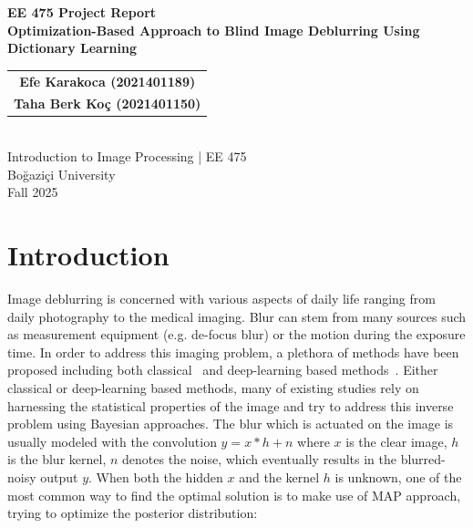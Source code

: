 \documentclass{article}
\theoremstyle{definition}
\begin{document}
\begin{titlepage}
    \centering

    {\Huge \textbf{EE 475 Project Report}}\\[3.5cm] %


{\Huge \textbf {Optimization-Based Approach to Blind Image Deblurring Using Dictionary Learning}}\\[3.5cm] %

    \begin{tabular}{c}
        \Large \textbf{Efe Karakoca (2021401189)} \\[0.5cm] %
        \Large \textbf{Taha Berk Koç (2021401150)} \\
    \end{tabular}\\[3 cm]

    {\large Introduction to Image Processing | EE 475}\\[0.5cm]

    {\large Boğaziçi University}\\[1cm]

    {\large Fall 2025}

    \vfill

    \begingroup
    \renewcommand\thefootnote{\roman{footnote}}
    \endgroup

\end{titlepage}


\section{Introduction}



Image deblurring is concerned with various aspects of daily life ranging from daily photography to the medical imaging. Blur can stem from many sources such as measurement equipment (e.g. de-focus blur) or the motion during the exposure time. In order to address this imaging problem, a plethora of methods have been proposed including both classical~\cite{ClassicBlur} and deep-learning based methods~\cite{DeepBlur}. Either classical or deep-learning based methods, many of existing studies rely on harnessing the statistical properties of the image and try to address this inverse problem using Bayesian approaches. The blur which is actuated on the image is usually modeled with the convolution $y=x * h+n$ where $x$ is the clear image, $h$ is the blur kernel, $n$ denotes the noise, which eventually results in the blurred-noisy output $y$. When both the hidden $x$ and the kernel $h$ is unknown, one of the most common way to find the optimal solution is to make use of MAP approach, trying to optimize the posterior distribution:
\end{document}
